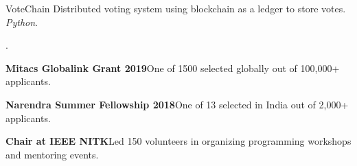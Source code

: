 \documentclass[10pt,letterpaper]{article}
\begin{document}
\headedsectiontwo
{VoteChain}{}{}
{
	Distributed voting system using blockchain as a ledger to store votes. \textit{Python}.
}

.


\begin{circlist}
	\item \textbf{Mitacs Globalink Grant 2019}\hspace{0.5em}One of 1500 selected globally out of 100,000+ applicants.
	\item \textbf{Narendra Summer Fellowship 2018}\hspace{0.5em}One of 13 selected in India out of 2,000+ applicants.
	\item \textbf{Chair at IEEE NITK}\hspace{0.5em}Led 150 volunteers in organizing programming workshops and mentoring events.
\end{circlist}

\end{document}
